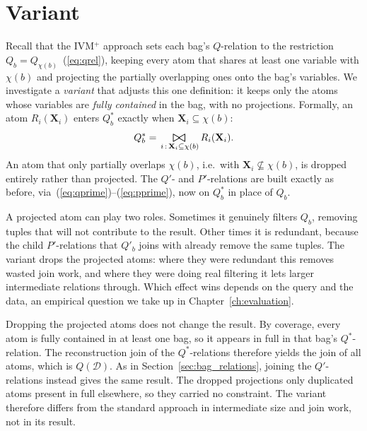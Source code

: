 \section{Variant}
\label{sec:variant_no_semijoin}

Recall that the IVM$^+$ approach sets each bag's $Q$-relation to the restriction $Q_b = Q_{\chi(b)}$~(\ref{eq:qrel}), keeping every atom that shares at least one variable with $\chi(b)$ and projecting the partially overlapping ones onto the bag's variables. We investigate a \emph{variant} that adjusts this one definition: it keeps only the atoms whose variables are \emph{fully contained} in the bag, with no projections. Formally, an atom $R_i(\mathbf{X}_i)$ enters $Q^*_b$ exactly when $\mathbf{X}_i \subseteq \chi(b)$:
\begin{equation}
    Q^*_b = \bigbowtie_{\,i\,:\,\mathbf{X}_i \subseteq \chi(b)} R_i(\mathbf{X}_i). \label{eq:qstar}
\end{equation}
An atom that only partially overlaps $\chi(b)$, i.e.\ with $\mathbf{X}_i \not\subseteq \chi(b)$, is dropped entirely rather than projected. The $Q'$- and $P'$-relations are built exactly as before, via~(\ref{eq:qprime})--(\ref{eq:pprime}), now on $Q^*_b$ in place of $Q_b$.

\medskip

A projected atom can play two roles. Sometimes it genuinely filters $Q_b$, removing tuples that will not contribute to the result. Other times it is redundant, because the child $P'$-relations that $Q'_b$ joins with already remove the same tuples. The variant drops the projected atoms: where they were redundant this removes wasted join work, and where they were doing real filtering it lets larger intermediate relations through. Which effect wins depends on the query and the data, an empirical question we take up in Chapter~\ref{ch:evaluation}.

\medskip

Dropping the projected atoms does not change the result. By coverage, every atom is fully contained in at least one bag, so it appears in full in that bag's $Q^*$-relation. The reconstruction join of the $Q^*$-relations therefore yields the join of all atoms, which is $Q(\mathcal{D})$. As in Section~\ref{sec:bag_relations}, joining the $Q'$-relations instead gives the same result. The dropped projections only duplicated atoms present in full elsewhere, so they carried no constraint. The variant therefore differs from the standard approach in intermediate size and join work, not in its result.

